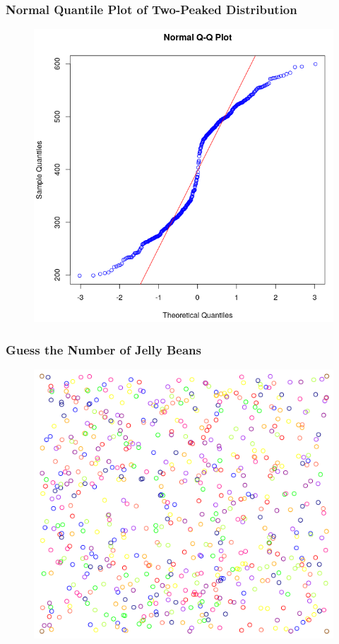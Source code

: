 \documentclass[xcolor=dvipsnames]{beamer}
\begin{document}
\begin{frame}
  \frametitle{Normal Quantile Plot of Two-Peaked Distribution}
\begin{figure}[h]
\includegraphics[scale=.35]{./diagrams/an-2pnqp.png}
\end{figure}
\end{frame}

\begin{frame}
  \frametitle{Guess the Number of Jelly Beans}
\begin{figure}[h]
\includegraphics[scale=.4]{./diagrams/an-jb.png}
\end{figure}
\end{frame}
\end{document}
